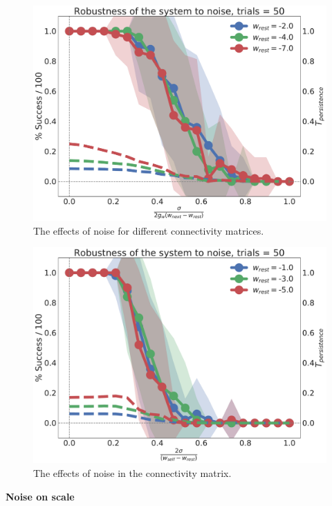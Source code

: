 \documentclass[10pt,a4paper]{article}
\begin{document}
\begin{figure}[H]
\centering
\includegraphics[scale=0.30]{recall_noise.pdf}
\caption{The effects of noise for different connectivity matrices. }
\label{fig:current_noise}
\end{figure}


\begin{figure}[H]
\centering
\includegraphics[scale=0.30]{matrix_noise.pdf}
\caption{The effects of noise in the connectivity matrix. }
\label{fig:matrix_noise}
\end{figure}

\textbf{Noise on scale}
\end{document}
